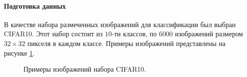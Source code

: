 \paragraph{Подготовка данных}
В качестве набора размеченных изображений для классификации был выбран CIFAR10. Этот набор состоит из $10$-ти классов, по $6000$ изображений размером $32 \times 32$ пикселя в каждом классе. Примеры изображений представлены на рисунке \ref{ris:CIFAR10}.
\begin{figure}[h]
	\caption{Примеры изображений набора CIFAR10.}
	\label{ris:CIFAR10}
\end{figure}

